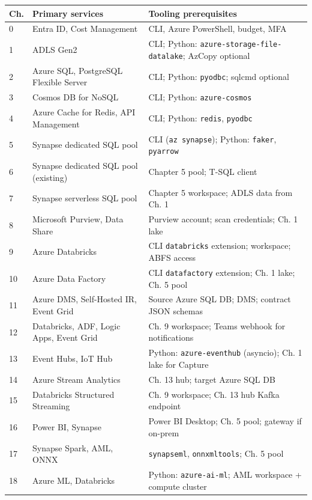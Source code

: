 \begin{center}
\footnotesize
\begin{tabular}{@{}p{0.9cm}p{5.4cm}p{6.9cm}@{}}
\toprule
\textbf{Ch.} & \textbf{Primary services} & \textbf{Tooling prerequisites} \\
\midrule
0 & Entra ID, Cost Management & CLI, Azure PowerShell, budget, MFA \\
1 & ADLS Gen2 & CLI; Python: \texttt{azure-storage-file-datalake}; AzCopy optional \\
2 & Azure SQL, PostgreSQL Flexible Server & CLI; Python: \texttt{pyodbc}; sqlcmd optional \\
3 & Cosmos DB for NoSQL & CLI; Python: \texttt{azure-cosmos} \\
4 & Azure Cache for Redis, API Management & CLI; Python: \texttt{redis}, \texttt{pyodbc} \\
5 & Synapse dedicated SQL pool & CLI (\texttt{az synapse}); Python: \texttt{faker}, \texttt{pyarrow} \\
6 & Synapse dedicated SQL pool (existing) & Chapter 5 pool; T-SQL client \\
7 & Synapse serverless SQL pool & Chapter 5 workspace; ADLS data from Ch. 1 \\
8 & Microsoft Purview, Data Share & Purview account; scan credentials; Ch. 1 lake \\
9 & Azure Databricks & CLI \texttt{databricks} extension; workspace; ABFS access \\
10 & Azure Data Factory & CLI \texttt{datafactory} extension; Ch. 1 lake; Ch. 5 pool \\
11 & Azure DMS, Self-Hosted IR, Event Grid & Source Azure SQL DB; DMS; contract JSON schemas \\
12 & Databricks, ADF, Logic Apps, Event Grid & Ch. 9 workspace; Teams webhook for notifications \\
13 & Event Hubs, IoT Hub & Python: \texttt{azure-eventhub} (asyncio); Ch. 1 lake for Capture \\
14 & Azure Stream Analytics & Ch. 13 hub; target Azure SQL DB \\
15 & Databricks Structured Streaming & Ch. 9 workspace; Ch. 13 hub Kafka endpoint \\
16 & Power BI, Synapse & Power BI Desktop; Ch. 5 pool; gateway if on-prem \\
17 & Synapse Spark, AML, ONNX & \texttt{synapseml}, \texttt{onnxmltools}; Ch. 5 pool \\
18 & Azure ML, Databricks & Python: \texttt{azure-ai-ml}; AML workspace + compute cluster \\

\end{tabular}
\end{center}
